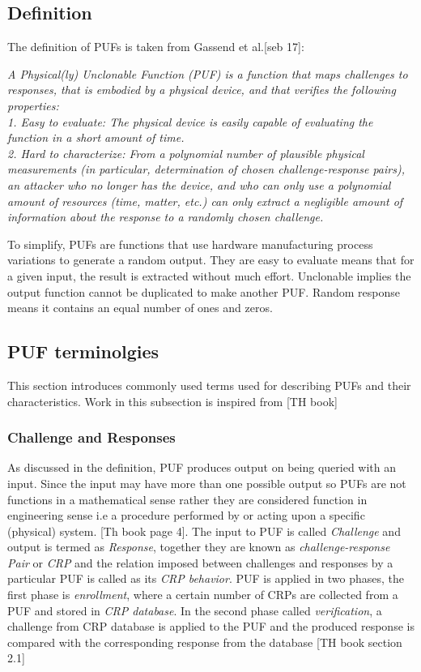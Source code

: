 \subsection{Definition}
The definition of PUFs is taken from Gassend et al.[seb 17]:

\emph{A Physical(ly) Unclonable Function (PUF) is a function that maps challenges to responses, that is embodied by a physical device, and that verifies the following properties:\\
1. Easy to evaluate: The physical device is easily capable of evaluating the function in a short amount of time.\\
2. Hard to characterize: From a polynomial number of plausible physical measurements (in particular, determination of chosen challenge-response pairs), an attacker who no longer has the device, and who can only use a polynomial amount of resources (time, matter, etc.) can only extract a negligible amount of information about the response to a randomly chosen challenge.\\}

To simplify, PUFs are functions that use hardware manufacturing process variations to generate a random output. They are easy to evaluate means that for a given input, the result is extracted without much effort. Unclonable implies the output function cannot be duplicated to make another PUF. Random response means it contains an equal number of ones and zeros.

\subsection{PUF terminolgies}
This section introduces commonly used terms used for describing PUFs and their characteristics. Work in this subsection is inspired from [TH book]

\subsubsection{Challenge and Responses}
As discussed in the definition, PUF produces output on being queried with an input. Since the input may have more than one possible output so PUFs are not functions in a mathematical sense rather they are considered function in engineering sense i.e a procedure performed by or acting upon a specific (physical) system. [Th book page 4]. The input to PUF is called \emph{Challenge} and output is termed as \emph{Response}, together they are known as \emph{challenge-response Pair} or \emph{CRP} and
the relation imposed between challenges and responses by a particular PUF is called as its \emph{CRP behavior}. PUF is applied in two phases, the first phase is \emph{enrollment}, where a certain number of CRPs are collected from a PUF and stored in \emph{CRP database}. In the second phase called \emph{verification}, a challenge from CRP database is applied to the PUF and the produced response is compared with the corresponding response from the database [TH book section 2.1]

